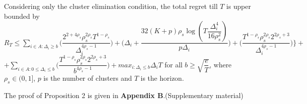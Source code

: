
	
	
	

\begin{proposition}
Considering only the cluster elimination condition, the total regret till $T$ is upper bounded by $R_{T}\leq \sum_{i\in A:\Delta_{i}\geq b}\bigg(\dfrac{2^{2+4\rho_{s}}\rho_{s}^{2\rho_{s}}T^{1-\rho_{s}}}{\Delta_{i}^{4\rho_{s}-1}}\bigg) + \bigg(\Delta_{i}+\dfrac{32(K+p)\rho_{s}\log{(T\dfrac{\Delta_{i}^{4}}{16\rho_{s}^{2}})}}{p\Delta_{i}}\bigg)  +  \bigg(\dfrac{T^{1-\rho_{s}}\rho_{s}^{2\rho_{s}}2^{2\rho_{s}+3}}{\Delta_{i}^{4\rho_{s} -1}} \bigg) \bigg \rbrace+$\newline$+\sum_{i\in A:0\leq\Delta_{i}\leq b}\bigg(\dfrac{T^{1-\rho_{s}}\rho_{s}^{2\rho_{s}}2^{2\rho_{s}+3}}{b^{4\rho_{s} -1}} \bigg) + max_{i:\Delta_{i}\leq b}\Delta_{i}T$ for all $b\geq \sqrt{\dfrac{e}{T}}$, where $\rho_{s}\in (0,1]$, $p$ is the number of clusters and $T$ is the horizon.
\end{proposition}

	The proof of Proposition 2 is given in \textbf{Appendix B}.(Supplementary material)


